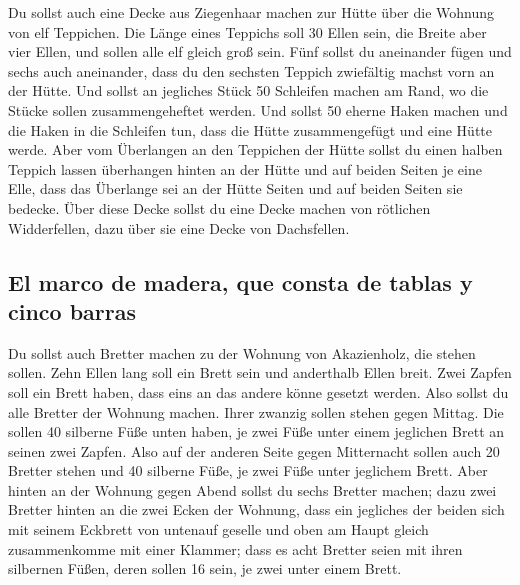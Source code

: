  Du sollst auch eine Decke aus Ziegenhaar machen zur Hütte
über die Wohnung von elf Teppichen.  Die Länge eines
Teppichs soll 30 Ellen sein, die Breite aber vier Ellen, und sollen alle
elf gleich groß sein.  Fünf sollst du aneinander fügen und
sechs auch aneinander, dass du den sechsten Teppich zwiefältig machst
vorn an der Hütte.  Und sollst an jegliches Stück 50
Schleifen machen am Rand, wo die Stücke sollen zusammengeheftet werden.
 Und sollst 50 eherne Haken machen und die Haken in die
Schleifen tun, dass die Hütte zusammengefügt und eine Hütte werde.
 Aber vom Überlangen an den Teppichen der Hütte sollst du
einen halben Teppich lassen überhangen hinten an der Hütte
 und auf beiden Seiten je eine Elle, dass das Überlange
sei an der Hütte Seiten und auf beiden Seiten sie bedecke.
 Über diese Decke sollst du eine Decke machen von
rötlichen Widderfellen, dazu über sie eine Decke von Dachsfellen.

\hypertarget{el-marco-de-madera-que-consta-de-tablas-y-cinco-barras}{%
\subsection{El marco de madera, que consta de tablas y cinco
barras}\label{el-marco-de-madera-que-consta-de-tablas-y-cinco-barras}}

 Du sollst auch Bretter machen zu der Wohnung von
Akazienholz, die stehen sollen.  Zehn Ellen lang soll ein
Brett sein und anderthalb Ellen breit.  Zwei Zapfen soll
ein Brett haben, dass eins an das andere könne gesetzt werden. Also
sollst du alle Bretter der Wohnung machen.  Ihrer zwanzig
sollen stehen gegen Mittag.  Die sollen 40 silberne Füße
unten haben, je zwei Füße unter einem jeglichen Brett an seinen zwei
Zapfen.  Also auf der anderen Seite gegen Mitternacht
sollen auch 20 Bretter stehen  und 40 silberne Füße, je
zwei Füße unter jeglichem Brett.  Aber hinten an der
Wohnung gegen Abend sollst du sechs Bretter machen;  dazu
zwei Bretter hinten an die zwei Ecken der Wohnung,  dass
ein jegliches der beiden sich mit seinem Eckbrett von untenauf geselle
und oben am Haupt gleich zusammenkomme mit einer Klammer;
 dass es acht Bretter seien mit ihren silbernen Füßen,
deren sollen 16 sein, je zwei unter einem Brett.

